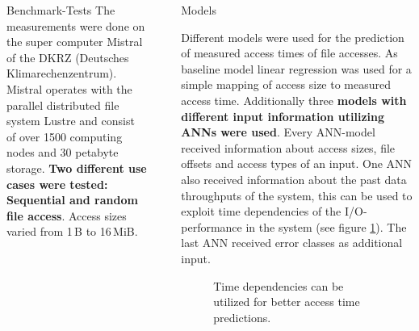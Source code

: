 \documentclass[final]{beamer}
\newlength{\sepwid}
\newlength{\onecolwid}
\begin{document}
\begin{frame}[t]
\begin{columns}[t]
\begin{column}{\onecolwid}
\begin{block}{Benchmark-Tests}
	The measurements were done on the super computer Mistral of the DKRZ (Deutsches Klimarechenzentrum).
	Mistral operates with the parallel distributed file system Lustre and consist of over 1500 computing nodes and 30 petabyte storage.
	\textbf{Two different use cases were tested: Sequential and random file access}.
	Access sizes varied from 1\,B to 16\,MiB.
	
\end{block}
	
\end{column} %

\begin{column}{\sepwid}\end{column} %

\begin{column}{\onecolwid} %
	

\begin{block}{Models}
	
	Different models were used for the prediction of measured access times of file accesses.
	As baseline model linear regression was used for a simple mapping of access size to measured access time.
	Additionally three \textbf{models with different input information utilizing ANNs were used}.
	Every ANN-model received information about access sizes, file offsets and access types of an input.
	One ANN also received information about the past data throughputs of the system, this can be used to exploit time dependencies of the I/O-performance in the system (see figure \ref{time_dep}). The last ANN received error classes as additional input.
	
	\begin{figure}
		\hfill
		\caption{Time dependencies can be utilized for better access time predictions.}
		\label{time_dep}
	\end{figure} 
	

\end{block}
\end{column}
\end{columns}
\end{frame}
\end{document}
